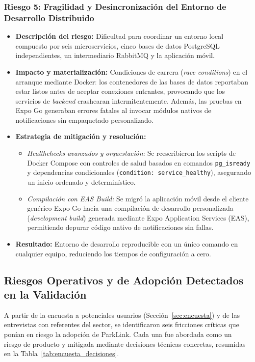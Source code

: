 \subsubsection{Riesgo 5: Fragilidad y Desincronización del Entorno de Desarrollo Distribuido}

\begin{itemize}
    \item \textbf{Descripción del riesgo:} Dificultad para coordinar un entorno local compuesto por seis microservicios, cinco bases de datos PostgreSQL independientes, un intermediario RabbitMQ y la aplicación móvil.
    \item \textbf{Impacto y materialización:} Condiciones de carrera (\textit{race conditions}) en el arranque mediante Docker: los contenedores de las bases de datos reportaban estar listos antes de aceptar conexiones entrantes, provocando que los servicios de \textit{backend} crashearan intermitentemente. Además, las pruebas en Expo Go generaban errores fatales al invocar módulos nativos de notificaciones sin empaquetado personalizado.
    \item \textbf{Estrategia de mitigación y resolución:}
    \begin{itemize}
        \item \textit{Healthchecks avanzados y orquestación:} Se reescribieron los scripts de Docker Compose con controles de salud basados en comandos \texttt{pg\_isready} y dependencias condicionales (\texttt{condition: service\_healthy}), asegurando un inicio ordenado y determinístico.
        \item \textit{Compilación con EAS Build:} Se migró la aplicación móvil desde el cliente genérico Expo Go hacia una compilación de desarrollo personalizada (\textit{development build}) generada mediante Expo Application Services (EAS), permitiendo depurar código nativo de notificaciones sin fallas.
    \end{itemize}
    \item \textbf{Resultado:} Entorno de desarrollo reproducible con un único comando en cualquier equipo, reduciendo los tiempos de configuración a cero.
\end{itemize}

\subsection{Riesgos Operativos y de Adopción Detectados en la Validación}

A partir de la encuesta a potenciales usuarios (Sección~\ref{sec:encuesta}) y de las entrevistas con referentes del sector, se identificaron seis fricciones críticas que ponían en riesgo la adopción de ParkLink. Cada una fue abordada como un riesgo de producto y mitigada mediante decisiones técnicas concretas, resumidas en la Tabla~\ref{tab:encuesta_decisiones}.

